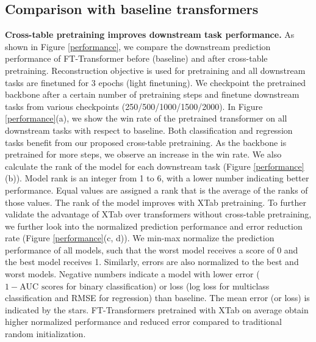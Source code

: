 \subsection{Comparison with baseline transformers} 

\textbf{Cross-table pretraining improves downstream task performance.} As shown in Figure \ref{performance}, we compare the downstream prediction performance of FT-Transformer before (baseline) and after cross-table pretraining. Reconstruction objective is used for pretraining and all downstream tasks are finetuned for 3 epochs (light finetuning). We checkpoint the pretrained backbone after a certain number of pretraining steps and finetune downstream tasks from various checkpoints (250/500/1000/1500/2000). In Figure \ref{performance}(a), we show the win rate of the pretrained transformer on all downstream tasks with respect to baseline. Both classification and regression tasks benefit from our proposed cross-table pretraining. As the backbone is pretrained for more steps, we observe an increase in the win rate. We also calculate the rank of the model for each downstream task (Figure \ref{performance}(b)). Model rank is an integer from 1 to 6, with a lower number indicating better performance. Equal values are assigned a rank that is the average of the ranks of those values. The rank of the model improves with XTab pretraining. To further validate the advantage of XTab over transformers without cross-table pretraining, we further look into the normalized prediction performance and error reduction rate (Figure \ref{performance}(c, d)). We min-max normalize the prediction performance of all models, such that the worst model receives a score of 0 and the best model receives 1. Similarly, errors are also normalized to the best and worst models. Negative numbers indicate a model with lower error ($1 - \text{AUC scores}$ for binary classification) or loss (log loss for multiclass classification and RMSE for regression) than baseline. The mean error (or loss) is indicated by the stars. FT-Transformers pretrained with XTab on average obtain higher normalized performance and reduced error compared to traditional random initialization.

